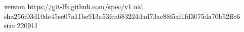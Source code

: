 version https://git-lfs.github.com/spec/v1
oid sha256:03d10de45ee07a11be913a53fca683224dad73ac88f5af1fd3075da70b52ffc6
size 220911
